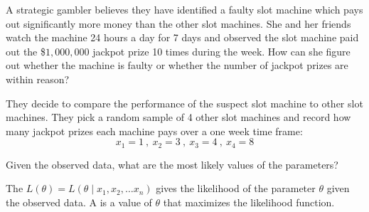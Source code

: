 \pagestyle{fancy}
\renewcommand{\theUnit}{6}
\ifthenelse{\isundefined{\UnitPageNumbers}}{}{\setcounter{page}{1}}
\rhead{Chapter \theUnit: Estimation}
\rfoot{\mypage}
\renewcommand{\footrulewidth}{.4pt}
\vspace*{-20pt} \thispagestyle{firstfooter}




\bb
\ii A strategic gambler believes they have identified a faulty slot machine which pays out significantly  more money than the other slot machines. She and her friends watch the machine 24 hours a day for 7 days and observed the slot machine paid out the \$$1,\!000,\!000$ jackpot prize 10 times during the week. How can she figure out whether the machine is faulty or whether the number of jackpot prizes are within reason?

\bb
\ii {} They decide to compare the performance of the suspect slot machine to other slot machines. They pick a random sample of 4 other slot machines and record how many jackpot prizes each machine pays over a one week time frame: %
\[ x_1=1 \ ,\  x_2=3\ ,\  x_3=4 \ , \ x_4=8 \]

\ii {}%

\bs
{}

\bs

\ii {} Given the observed data, what are the most likely values of the parameters?

\vspace{1.15in}

\ee
\ee

\bbox
The  $L(\theta)= L( \theta \mid x_1, x_2, \ldots x_n)$ gives the likelihood of the
parameter $\theta$ given the observed data. A  is
a value of $\theta$ that maximizes the likelihood function.

